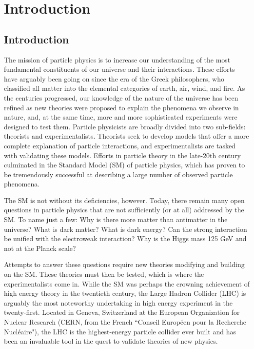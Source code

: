 \chapter{Introduction}

\section{Introduction}\label{sec:intro}

The mission of particle physics is to increase our understanding of the most fundamental constituents of our universe and their interactions. These efforts have arguably been going on since the era of the Greek philosophers, who classified all matter into the elemental categories of earth, air, wind, and fire. As the centuries progressed, our knowledge of the nature of the universe has been refined as new theories were proposed to explain the phenomena we observe in nature, and, at the same time, more and more sophisticated experiments were designed to test them. Particle physicists are broadly divided into two sub-fields: theorists and experimentalists. Theorists seek to develop models that offer a more complete explanation of particle interactions, and experimentalists are tasked with validating these models. Efforts in particle theory in the late-20th century culminated in the Standard Model (SM) of particle physics, which has proven to be tremendously successful at describing a large number of observed particle phenomena.

The SM is not without its deficiencies, however. Today, there remain many open questions in particle physics that are not sufficiently (or at all) addressed by the SM. To name just a few: Why is there more matter than antimatter in the universe? What is dark matter? What is dark energy? Can the strong interaction be unified with the electroweak interaction?
Why is the Higgs mass 125 GeV and not at the Planck scale?

Attempts to answer these questions require new theories modifying and building on the SM. These theories must then be tested, which is where the experimentalists come in. While the SM was perhaps the crowning achievement of high energy theory in the twentieth century, the Large Hadron Collider (LHC) is arguably the most noteworthy undertaking in high energy experiment in the twenty-first. Located in Geneva, Switzerland at the European Organization for Nuclear Research (CERN, from the French ``Conseil Européen pour la Recherche Nucléaire"), the LHC is the highest-energy particle collider ever built and has been an invaluable tool in the quest to validate theories of new physics.

